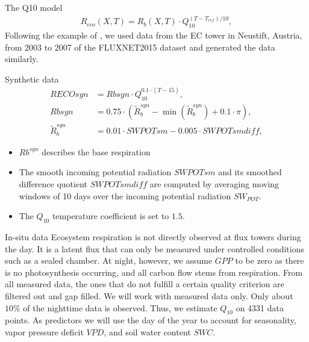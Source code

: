 \documentclass{beamer}
\newcommand{\Q}{Q_{10}}
\newcommand{\SWC}{SWC}
\newcommand{\GPP}{GPP}
\newcommand{\VPD}{VPD}
\newcommand{\Rbsyn}{Rbsyn}
\newcommand{\RECOsyn}{RECOsyn}
\newcommand{\SWPOTsmdiff}{SWPOTsmdiff}
\newcommand{\SWPOTsm}{SWPOTsm}
\newcommand{\Rb}{Rb}
\begin{document}
\begin{frame}{The Q10 model} 
	\begin{align}\label{eq:Q10}
	R_{eco}(X,T)=R_b(X, T)\cdot \Q^{(T-T_{ref})/10}, \end{align} Following
	the example of \cite{Reichstein2022}, we used data from the EC tower in
	Neustift, Austria, from 2003 to 2007 of the FLUXNET2015 dataset and
	generated the data similarly.

	\begin{block}{Synthetic data} 
		\vspace{-0.7cm}
		\small
	\begin{align} \RECOsyn &= \Rbsyn \cdot
		\Q^{0.1\cdot(T-15)},\\ \Rbsyn &= 0.75 \cdot (\tilde{R}^{syn}_b
		- \min(\tilde{R}^{syn}_b) + 0.1\cdot \pi),\label{eq:Rb_zero}\\
	\tilde{R}^{syn}_b &= 0.01 \cdot \SWPOTsm - 0.005 \cdot \SWPOTsmdiff,
	\end{align} 
		\vspace{-0.8cm}
		\begin{itemize}
			\item  $\Rb^{syn}$ describes the base respiration 
			\item The smooth incoming
	potential radiation $\SWPOTsm$ and its smoothed difference quotient
	$\SWPOTsmdiff$ are computed by averaging moving windows of 10 days over
	the incoming potential radiation $SW_{POT}$. 
\item The $\Q$ temperature coefficient is set to $1.5$.
		\end{itemize}
	\end{block}
 
\end{frame}

\begin{frame}{In-situ data}
	Ecosystem respiration is not directly observed at flux towers during
	the day.  It is a latent flux that can only be measured under
	controlled conditions such as a sealed chamber. At night, however, we
	assume $\GPP$ to be zero as there is no photosynthesis occurring, and
	all carbon flow stems from respiration. From all measured data, the
	ones that do not fulfill a certain quality criterion are filtered out
	and gap filled. We will work with measured data only. Only about $10\%$
	of the nighttime data is observed. 
	Thus, we estimate $\Q$ on 4331 data
	points. As predictors we will use the day of the year to account for
	seasonality, vapor pressure deficit $\VPD$, and soil water content
	$\SWC$.  
\end{frame} 
\end{document}
